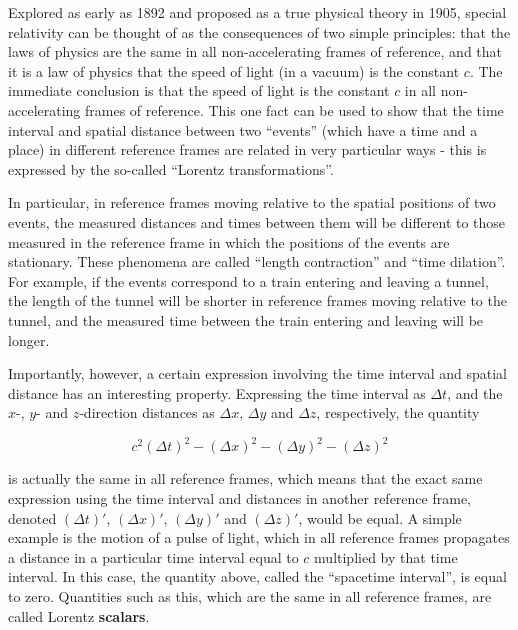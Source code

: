 \documentclass[12pt]{article}
\begin{document}
Explored as early as 1892 and proposed as a true physical theory in 1905, special relativity can be thought of as the consequences of two simple principles: that the laws of physics are the same in all non-accelerating frames of reference, and that it is a law of physics that the speed of light (in a vacuum) is the constant $c$. The immediate conclusion is that the speed of light is the constant $c$ in all non-accelerating frames of reference. This one fact can be used to show that the time interval and spatial distance between two ``events'' (which have a time and a place) in different reference frames are related in very particular ways - this is expressed by the so-called ``Lorentz transformations''.
\newline

In particular, in reference frames moving relative to the spatial positions of two events, the measured distances and times between them will be different to those measured in the reference frame in which the positions of the events are stationary. These phenomena are called ``length contraction'' and ``time dilation''. For example, if the events correspond to a train entering and leaving a tunnel, the length of the tunnel will be shorter in reference frames moving relative to the tunnel, and the measured time between the train entering and leaving will be longer.
\newline

Importantly, however, a certain expression involving the time interval and spatial distance has an interesting property. Expressing the time interval as $\Delta t$, and the $x$-, $y$- and $z$-direction distances as $\Delta x$, $\Delta y$ and $\Delta z$, respectively, the quantity

\begin{equation}
    c^2 {\left(\Delta t\right)}^2 - {\left(\Delta x\right)}^2 - {\left(\Delta y\right)}^2 - {\left(\Delta z\right)}^2
\end{equation}

is actually the same in all reference frames, which means that the exact same expression using the time interval and distances in another reference frame, denoted ${\left(\Delta t\right)}'$, ${\left(\Delta x\right)}'$, ${\left(\Delta y\right)}'$ and ${\left(\Delta z\right)}'$, would be equal. A simple example is the motion of a pulse of light, which in all reference frames propagates a distance in a particular time interval equal to $c$ multiplied by that time interval. In this case, the quantity above, called the ``spacetime interval'', is equal to zero. Quantities such as this, which are the same in all reference frames, are called Lorentz \textbf{scalars}.
\end{document}
